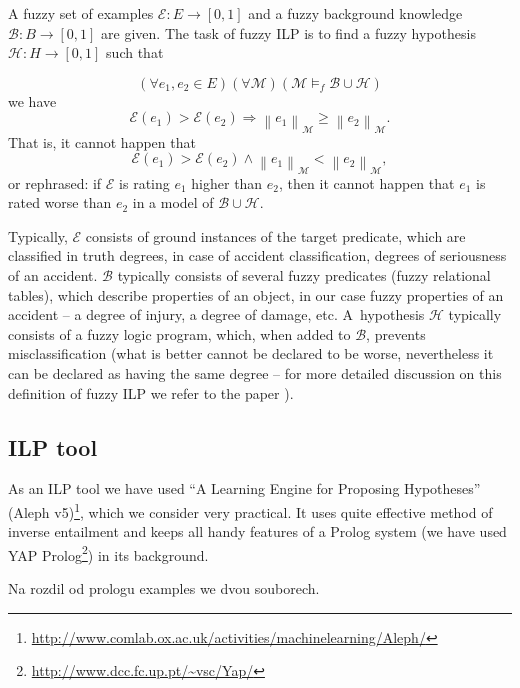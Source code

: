 \begin{definition}
A fuzzy set of examples ${\mathcal E}:E\longrightarrow [0,1]$ and a fuzzy background knowledge ${\mathcal B}:B\longrightarrow [0,1]$ are given. The task of fuzzy ILP is to find a fuzzy hypothesis ${\mathcal H}:H\longrightarrow [0,1]$ such that 

$$
(\forall e_1,e_2\in E)(\forall {\mathcal M})({\mathcal M}\models_f {\mathcal B}\cup {\mathcal H})
$$
we have
$$
{\mathcal E}(e_1)>{\mathcal E}(e_2)\Rightarrow \left\|e_1\right\|_{{\mathcal M}}\ge \left\|e_2\right\|_{{\mathcal M}}.
$$
That is, it cannot happen that
$$
{\mathcal E}(e_1)>{\mathcal E}(e_2) \wedge \left\|e_1\right\|_{{\mathcal M}}< \left\|e_2\right\|_{{\mathcal M}},
$$
or rephrased: if ${\mathcal E}$ is rating $e_1$ higher than $e_2$, then it cannot happen that $e_1$ is rated worse than $e_2$ in a model of ${\mathcal B}\cup {\mathcal H}$.
\end{definition}

Typically, ${\mathcal E}$ consists of ground instances of the target predicate, which are classified in truth degrees, in case of accident classification, degrees of seriousness of an accident. ${\mathcal B}$ typically consists of several fuzzy predicates (fuzzy relational tables), which describe properties of an object, in our case fuzzy properties of an accident -- a degree of injury, a degree of damage, etc. 
A~hypothesis ${\mathcal H}$ typically consists of a fuzzy logic program, which, when added to ${\mathcal B}$, prevents misclassification (what is better cannot be declared to be worse, nevertheless it can be declared as having the same degree -- for more detailed discussion on this definition of fuzzy ILP we refer to the paper \citep{biblio:FILP}).


\subsection{ILP tool} \label{sec:ch30_ILP_tool}
As an ILP tool we have used ``A Learning Engine for Proposing Hypotheses'' (Aleph v5)\footnote{\url{http://www.comlab.ox.ac.uk/activities/machinelearning/Aleph/}}, which we consider very practical. It uses quite effective method of inverse entailment \citep{biblio:InverseEntailment} and keeps all handy features of a Prolog system (we have used YAP Prolog\footnote{\url{http://www.dcc.fc.up.pt/~vsc/Yap/}}) in its background.


Na rozdil od prologu examples we dvou souborech.

